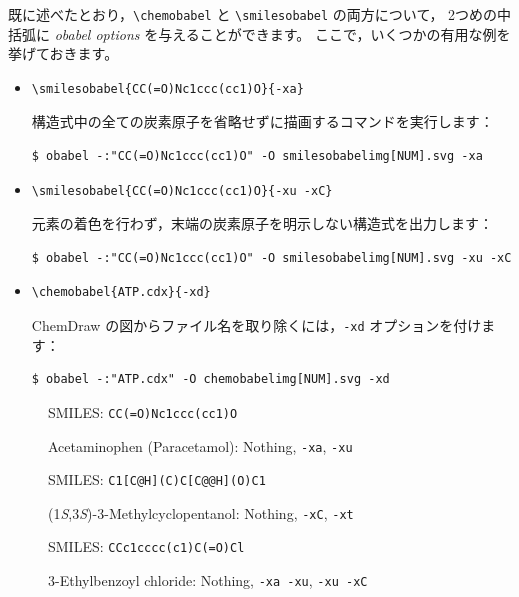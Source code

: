 \documentclass[12pt]{ltjsarticle}
\begin{document}
既に述べたとおり，\verb|\chemobabel| と \verb|\smilesobabel| の両方について，
2つめの中括弧に \textit{obabel options} を与えることができます。
ここで，いくつかの有用な例を挙げておきます。
\begin{itemize}
\item
\begin{verbatim}
\smilesobabel{CC(=O)Nc1ccc(cc1)O}{-xa}
\end{verbatim}
構造式中の全ての炭素原子を省略せずに描画するコマンドを実行します：
\begin{verbatim}
$ obabel -:"CC(=O)Nc1ccc(cc1)O" -O smilesobabelimg[NUM].svg -xa
\end{verbatim}
\item
\begin{verbatim}
\smilesobabel{CC(=O)Nc1ccc(cc1)O}{-xu -xC}
\end{verbatim}
元素の着色を行わず，末端の炭素原子を明示しない構造式を出力します：
\begin{verbatim}
$ obabel -:"CC(=O)Nc1ccc(cc1)O" -O smilesobabelimg[NUM].svg -xu -xC
\end{verbatim}
\item
\begin{verbatim}
\chemobabel{ATP.cdx}{-xd}
\end{verbatim}
ChemDraw の図からファイル名を取り除くには，\texttt{-xd} オプションを付けます：
\begin{verbatim}
$ obabel -:"ATP.cdx" -O chemobabelimg[NUM].svg -xd
\end{verbatim}
\end{itemize}

\begin{figure}[ht]
  \centering
  \caption{Acetaminophen (Paracetamol): Nothing, \texttt{-xa}, \texttt{-xu}}
  SMILES: \verb|CC(=O)Nc1ccc(cc1)O|
\end{figure}

\begin{figure}[ht]
  \centering
  \caption{(1\textit{S},3\textit{S})-3-Methylcyclopentanol: Nothing, \texttt{-xC}, \texttt{-xt}}
  SMILES: \verb|C1[C@H](C)C[C@@H](O)C1|
\end{figure}

\begin{figure}[ht]
  \centering
  \caption{3-Ethylbenzoyl chloride: Nothing, \texttt{-xa -xu}, \texttt{-xu -xC}}
  SMILES: \verb|CCc1cccc(c1)C(=O)Cl|
\end{figure}
\end{document}
